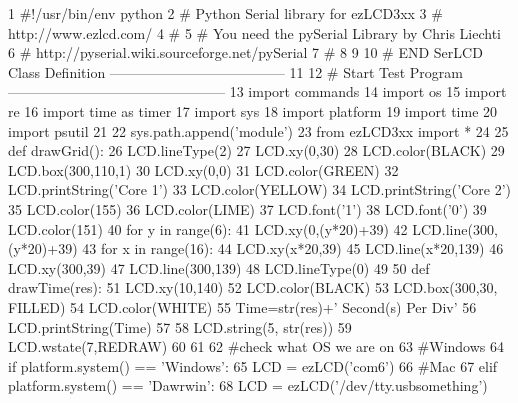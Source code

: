 \begin{DoxyCodeInclude}
1 \textcolor{comment}{#!/usr/bin/env python}
2 \textcolor{comment}{# Python Serial library for ezLCD3xx}
3 \textcolor{comment}{# http://www.ezlcd.com/}
4 \textcolor{comment}{#}
5 \textcolor{comment}{# You need the pySerial Library by Chris Liechti}
6 \textcolor{comment}{# http://pyserial.wiki.sourceforge.net/pySerial}
7 \textcolor{comment}{#}
8 
9 
10 \textcolor{comment}{# END SerLCD Class Definition --------------------------------------}
11 
12 \textcolor{comment}{# Start Test Program -----------------------------------------------}
13 \textcolor{keyword}{import} commands
14 \textcolor{keyword}{import} os
15 \textcolor{keyword}{import} re
16 \textcolor{keyword}{import} time \textcolor{keyword}{as} timer
17 \textcolor{keyword}{import} sys
18 \textcolor{keyword}{import} platform
19 \textcolor{keyword}{import} time
20 \textcolor{keyword}{import} psutil
21     
22 sys.path.append(\textcolor{stringliteral}{'module'}) 
23 \textcolor{keyword}{from} ezLCD3xx \textcolor{keyword}{import} *
24 
25 \textcolor{keyword}{def }drawGrid():
26     LCD.lineType(2)
27     LCD.xy(0,30)
28     LCD.color(BLACK)
29     LCD.box(300,110,1)
30     LCD.xy(0,0)
31     LCD.color(GREEN)
32     LCD.printString(\textcolor{stringliteral}{'Core 1'})
33     LCD.color(YELLOW)
34     LCD.printString(\textcolor{stringliteral}{'Core 2'})
35     LCD.color(155)
36     LCD.color(LIME)
37     LCD.font(\textcolor{stringliteral}{'1'})
38     LCD.font(\textcolor{stringliteral}{'0'})
39     LCD.color(151)
40     \textcolor{keywordflow}{for} y \textcolor{keywordflow}{in} range(6):
41         LCD.xy(0,(y*20)+39)
42         LCD.line(300,(y*20)+39)
43     \textcolor{keywordflow}{for} x \textcolor{keywordflow}{in} range(16):
44         LCD.xy(x*20,39)
45         LCD.line(x*20,139)
46     LCD.xy(300,39)
47     LCD.line(300,139)
48     LCD.lineType(0)
49     
50 \textcolor{keyword}{def }drawTime(res):
51     LCD.xy(10,140)
52     LCD.color(BLACK)
53     LCD.box(300,30, FILLED)
54     LCD.color(WHITE)
55     Time=str(res)+\textcolor{stringliteral}{' Second(s) Per Div'}
56     LCD.printString(Time)
57 
58     LCD.string(5, str(res))
59     LCD.wstate(7,REDRAW)
60 
61 
62 \textcolor{comment}{#check what OS we are on}
63 \textcolor{comment}{#Windows}
64 \textcolor{keywordflow}{if} platform.system() == \textcolor{stringliteral}{'Windows'}:
65     LCD = ezLCD(\textcolor{stringliteral}{'com6'}) 
66 \textcolor{comment}{#Mac}
67 \textcolor{keywordflow}{elif} platform.system() == \textcolor{stringliteral}{'Dawrwin'}:
68     LCD = ezLCD(\textcolor{stringliteral}{'/dev/tty.usbsomething'})

\end{DoxyCodeInclude}
